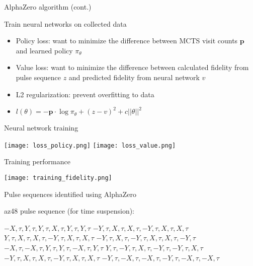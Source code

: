 \documentclass{beamer}
\begin{document}
\begin{frame}{AlphaZero algorithm (cont.)}

Train neural networks on collected data

\begin{itemize}

\item
Policy loss: want to minimize the difference between MCTS visit
counts \(\mathbf{p}\) and learned policy \(\pi_\theta\)
\item
Value loss: want to minimize the difference between calculated
fidelity from pulse sequence \(z\) and predicted fidelity from
neural network \(v\)
\item
L2 regularization: prevent overfitting to data
\item
\(l(\theta) = -\mathbf{p} \cdot \log\pi_\theta + (z - v)^2 + c||\theta||^2\)
\end{itemize}
\end{frame}


\begin{frame}{Neural network training}

\texttt{[image: loss\_policy.png]}
\texttt{[image: loss\_value.png]}
\end{frame}

\begin{frame}{Training performance}

\texttt{[image: training\_fidelity.png]}
\end{frame}

\begin{frame}{Pulse sequences identified using AlphaZero}

\textrm{az48} pulse sequence (for time suspension):

$ -X, \tau, Y, \tau, Y, \tau, X, \tau, Y, \tau, Y, \tau $
$ -Y, \tau, X, \tau, X, \tau, -Y, \tau, X, \tau, X, \tau $
$ Y, \tau, X, \tau, X, \tau, -Y, \tau, X, \tau, X, \tau $
$ -Y, \tau, X, \tau, -Y, \tau, X, \tau, X, \tau, -Y, \tau $
$ -X, \tau, -X, \tau, Y, \tau, Y, \tau, -X, \tau, Y, \tau $
$ Y, \tau, -Y, \tau, X, \tau, -Y, \tau, -Y, \tau, X, \tau $
$ -Y, \tau, X, \tau, X, \tau, -Y, \tau, X, \tau, X, \tau $
$ -Y, \tau, -X, \tau, -X, \tau, -Y, \tau, -X, \tau, -X, \tau $

\end{frame}
\end{document}
